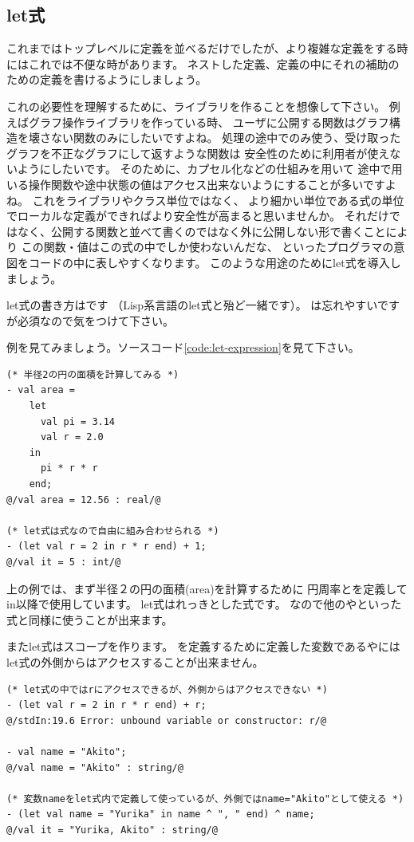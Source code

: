 \documentclass[11pt,a4paper]{jarticle}
\begin{document}
\subsection{let式}
これまではトップレベルに定義を並べるだけでしたが、より複雑な定義をする時にはこれでは不便な時があります。
ネストした定義、定義の中にそれの補助のための定義を書けるようにしましょう。

これの必要性を理解するために、ライブラリを作ることを想像して下さい。
例えばグラフ操作ライブラリを作っている時、
ユーザに公開する関数はグラフ構造を壊さない関数のみにしたいですよね。
処理の途中でのみ使う、受け取ったグラフを不正なグラフにして返すような関数は
安全性のために利用者が使えないようにしたいです。
そのために、カプセル化などの仕組みを用いて
途中で用いる操作関数や途中状態の値はアクセス出来ないようにすることが多いですよね。
これをライブラリやクラス単位ではなく、
より細かい単位である式の単位でローカルな定義ができればより安全性が高まると思いませんか。
それだけではなく、公開する関数と並べて書くのではなく外に公開しない形で書くことにより
この関数・値はこの式の中でしか使わないんだな、
といったプログラマの意図をコードの中に表しやすくなります。
このような用途のためにlet式を導入しましょう。

let式の書き方はです
（Lisp系言語のlet式と殆ど一緒です）。
は忘れやすいですが必須なので気をつけて下さい。

例を見てみましょう。ソースコード\ref{code:let-expression}を見て下さい。

\begin{lstlisting}[caption=let式,label=code:let-expression]
(* 半径2の円の面積を計算してみる *)
- val area =
    let
      val pi = 3.14
      val r = 2.0
    in
      pi * r * r
    end;
@/val area = 12.56 : real/@

(* let式は式なので自由に組み合わせられる *)
- (let val r = 2 in r * r end) + 1;
@/val it = 5 : int/@
\end{lstlisting}

上の例では、まず半径２の円の面積(area)を計算するために
円周率とを定義してin以降で使用しています。
let式はれっきとした式です。
なので他のやといった式と同様に使うことが出来ます。

またlet式はスコープを作ります。
を定義するために定義した変数であるやには
let式の外側からはアクセスすることが出来ません。

\begin{lstlisting}[caption=let式のスコープ,label=code:let-scope]
(* let式の中ではrにアクセスできるが、外側からはアクセスできない *)
- (let val r = 2 in r * r end) + r;
@/stdIn:19.6 Error: unbound variable or constructor: r/@

- val name = "Akito";
@/val name = "Akito" : string/@

(* 変数nameをlet式内で定義して使っているが、外側ではname="Akito"として使える *)
- (let val name = "Yurika" in name ^ ", " end) ^ name;
@/val it = "Yurika, Akito" : string/@
\end{lstlisting}
\end{document}
